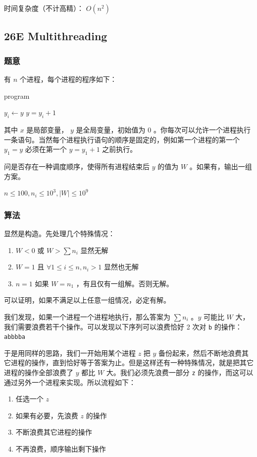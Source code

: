 \documentclass[11pt]{article}
\begin{document}
    时间复杂度（不计高精）： $O(n^2)$
\subsection{26E   Multithreading}
\label{sec-2-2}
\subsubsection{题意}
\label{sec-2-2-1}

    有 $n$ 个进程，每个进程的程序如下：
\begin{algorithm}
  \label{algo:26E}
  \caption{program}
  \begin{algorithmic}
      \STATE $y_i \leftarrow y$
      \STATE $y = y_i + 1$
    \ENDFOR
  \end{algorithmic}
\end{algorithm}
    
    其中 $x$ 是局部变量， $y$ 是全局变量，初始值为 0 。你每次可以允许一个进程执行一条语句。当然每个进程执行语句的顺序是固定的，例如第一个进程的第一个 $y_1 = y$ 必须在第一个 $y = y_1 + 1$ 之前执行。

    问是否存在一种调度顺序，使得所有进程结束后 $y$ 的值为 $W$ 。如果有，输出一组方案。

    $n \leq 100, n_i \leq 10^3, |W| \leq 10^9$ 
\subsubsection{算法}
\label{sec-2-2-2}

    显然是构造。先处理几个特殊情况：
\begin{enumerate}
\item $W < 0$ 或 $W > \sum n_i$ 
         显然无解
\item $W = 1$ 且 $\forall 1 \leq i \leq n, n_i > 1$
         显然也无解
\item $n = 1$ 
         如果 $W = n_1$ ，有且仅有一组解。否则无解。
\end{enumerate}

    可以证明，如果不满足以上任意一组情况，必定有解。

    我们发现，如果一个进程一个进程地执行，那么答案为 $\sum n_i$ 。$y$ 可能比 $W$ 大，我们需要浪费若干个操作。可以发现以下序列可以浪费恰好 2 次对 \texttt{b} 的操作： \texttt{abbbba} 

    于是用同样的思路，我们一开始用某个进程 $z$ 把 $y$ 备份起来，然后不断地浪费其它进程的操作，直到恰好等于答案为止。但是这样还有一种特殊情况，就是把其它进程的操作全部浪费了 $y$ 都比 $W$ 大。我们必须先浪费一部分 \texttt{z} 的操作，而这可以通过另外一个进程来实现。所以流程如下：
\begin{enumerate}
\item 任选一个 $z$
\item 如果有必要，先浪费 $z$ 的操作
\item 不断浪费其它进程的操作
\item 不再浪费，顺序输出剩下操作
\end{enumerate}
\end{document}
